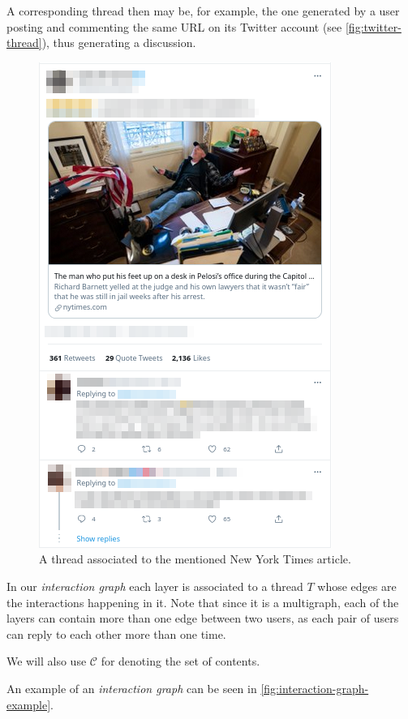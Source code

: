A corresponding thread then may be, for example, the one generated by a user
posting and commenting the same URL on its Twitter account (see
\autoref{fig:twitter-thread}), thus generating a discussion.

\begin{figure}
	\centering
	\includegraphics[width=0.6\linewidth]{tex/img/twitter_thread.png}
	\caption[Thread-content distinction example from Twitter]{A thread
		associated to the mentioned New York Times article.}%
	\label{fig:twitter-thread}
\end{figure}

In our \emph{interaction graph} each layer is associated
to a thread $T$ whose edges are the interactions happening in it.
Note that since it is a multigraph, each of the layers can contain more than one
edge between two users, as each pair of users can reply to each other more than
one time.

We will also use $\mathcal{C} $ for denoting the set of contents.

An example of an \emph{interaction graph} can be seen in
\autoref{fig:interaction-graph-example}.

